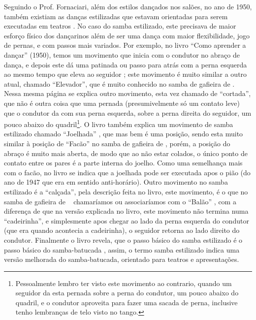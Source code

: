 \begin{itemize}
Seguindo o Prof. Fornaciari, além dos estilos dançados nos salões, 
no ano de 1950, também existiam as danças estilizadas que estavam orientadas 
para serem executadas em teatros \cite[pp. 149]{fornaciari1950aprender}. 
No caso do samba estilizado, este precisava de maior esforço físico dos dançarinos 
além de ser uma dança com maior flexibilidade, jogo de pernas, e com passos mais variados.
Por exemplo, no livro ``Como aprender a dançar'' (1950), temos um movimento que inicia com o condutor no abraço de dança,
e depois este dá uma patinada ou passo para atrás com a perna esquerda 
ao mesmo tempo que eleva ao seguidor \cite[pp. 160-1961]{fornaciari1950aprender};
este movimento  é muito similar a outro atual, chamado ``Elevador'', 
que é muito conhecido no samba de gafieira de \AnoLivro.
Nessa mesma página se explica outro movimento, esta vez chamado de ``cortada'', 
que não é outra coisa que uma pernada (presumivelmente só um contato leve) que o condutor da com sua perna esquerda,
sobre a perna direita do seguidor, um pouco abaixo do quadril\footnote{
Pessoalmente lembro ter visto este movimento ao contrario, quando um seguidor da esta pernada 
sobre a perna do condutor, um pouco abaixo do quadril, e o condutor aproveita para fazer uma sacada de perna,
inclusive tenho lembranças de telo visto no tango.}.
O livro também explica um movimento de samba estilizado chamado ``Joelhada'' \cite[pp. 160-1961]{fornaciari1950aprender}, 
que mas bem é uma posição, sendo esta muito similar à posição de ``Facão'' no samba de gafieira de \AnoLivro,
porém, a posição do abraço é muito mais aberta, de modo que ao não estar colados,
o único ponto de contato entre os pares é a parte interna do joelho. 
Como uma semelhança mais com o facão,
no livro se indica que a joelhada pode ser executada apos o pião (do ano de 1947 que era em sentido anti-horário).
Outro movimento no samba estilizado é a ``calçada'', pela descrição feita no livro,
este movimento, é o que no samba de gafieira de \AnoLivro~ chamaríamos ou associaríamos com o ``Balão'' \cite[pp. 162]{fornaciari1950aprender},
com a diferença de que na versão explicada no livro, este movimento não termina numa ``cadeirinha'',
e simplesmente apos chegar ao lado da perna esquerda do condutor (que era quando acontecia a cadeirinha), 
o seguidor retorna ao lado direito do condutor. 
Finalmente o livro revela,
que o passo básico do samba estilizado é o passo básico do samba-batucada \cite[pp. 163]{fornaciari1950aprender},
assim, o termo samba estilizado indica uma versão melhorada do samba-batucada,
orientado para teatros e apresentações. 


\end{itemize}
